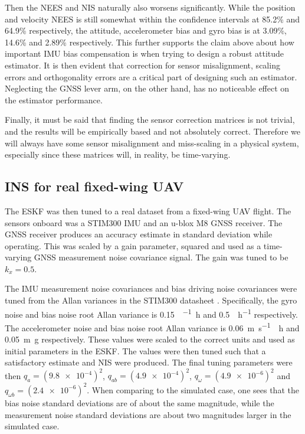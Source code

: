 Then the NEES and NIS naturally also worsens significantly. While the position and velocity NEES is still somewhat within the confidence intervals at 85.2\% and 64.9\% respectively, the attitude, accelerometer bias and gyro bias is at 3.09\%, 14.6\% and 2.89\% respectively. This further supports the claim above about how important IMU bias compensation is when trying to design a robust attitude estimator. It is then evident that correction for sensor misalignment, scaling errors and orthogonality errors are a critical part of designing such an estimator. Neglecting the GNSS lever arm, on the other hand, has no noticeable effect on the estimator performance.

Finally, it must be said that finding the sensor correction matrices is not trivial, and the results will be empirically based and not absolutely correct. Therefore we will always have some sensor misalignment and miss-scaling in a physical system, especially since these matrices will, in reality, be time-varying.

\subsection{INS for real fixed-wing UAV}


The ESKF was then tuned to a real dataset from a fixed-wing UAV flight. The sensors onboard was a STIM300 IMU and an u-blox M8 GNSS receiver. The GNSS receiver produces an accuracy estimate in standard deviation while operating. This was scaled by a gain parameter, squared and used as a time-varying GNSS measurement noise covariance signal. The gain was tuned to be $k_x = 0.5$.

The IMU measurement noise covariances and bias driving noise covariances were tuned from the Allan variances in the STIM300 datasheet \cite{stim300}. Specifically, the gyro noise and bias noise root Allan variance is \SI{0.15}{\deg\per\sqrt\hour} and \SI{0.5}{\deg\per\hour} respectively. The accelerometer noise and bias noise root Allan variance is \SI{0.06}{\meter\per\second\sqrt\hour} and \SI{0.05}{\meter g} respectively. These values were scaled to the correct units and used as initial parameters in the ESKF. The values were then tuned such that a satisfactory estimate and NIS were produced. The final tuning parameters were 
then $q_{a} = (\SI{9.8e-4})^2$, $ q_{ab} = (\SI{4.9e-4})^2$, $q_{\omega} = (\SI{4.9e-6})^2$ and $q_{\omega b} = (\SI{2.4e-6})^2$. When comparing to the simulated case, one sees that the bias noise standard deviations are of about the same magnitude, while the measurement noise standard deviations are about two magnitudes larger in the simulated case.

